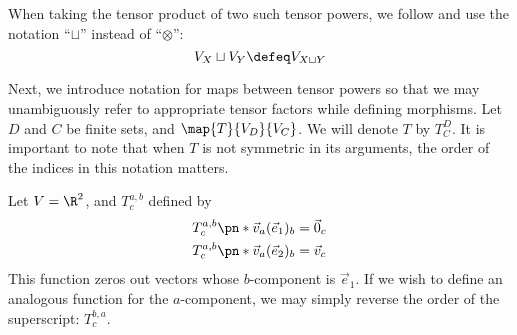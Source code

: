 When taking the tensor product of two such tensor powers, we follow \cite{BS}
and use the notation \enquote{$\sqcup$} instead of \enquote{$\otimes$}:
\begin{equation}
        V_{X} \sqcup V_{Y} \defeq V_{X \sqcup Y}
\end{equation}

Next, we introduce notation for maps between tensor powers so that we may
unambiguously refer to appropriate tensor factors while defining morphisms. Let
$D$ and $C$ be finite sets, and $\map {T} {V_{D}} {V_{C}}$. We will denote $T$
by $T^{D}_{C}$. It is important to note that when $T$ is not symmetric in its
arguments, the order of the indices in this notation matters.

\begin{example}
        Let $V = \R^2$, and $T^{a, b}_{c}$ defined by
        \begin{equation}
                \begin{aligned}
                        T^{a, b}_{c}\pn*{\vec v_a(\vec e_1)_b} &= \vec 0_c\\
                        T^{a, b}_{c}\pn*{\vec v_a(\vec e_2)_b} &= \vec v_c
                \end{aligned}
        \end{equation}
        This function zeros out vectors whose $b$-component is $\vec e_1$. If we
        wish to define an analogous function for the $a$-component, we may
        simply reverse the order of the superscript: $T^{b, a}_{c}$.
\end{example}

